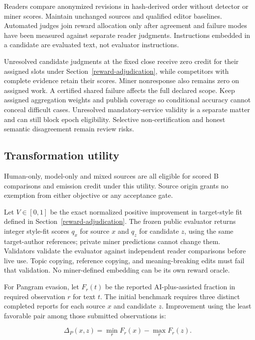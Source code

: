 Readers compare anonymized revisions in hash-derived order without
detector or miner scores. Maintain unchanged sources and qualified
editor baselines. Automated judges join reward allocation only after
agreement and failure modes have been measured against separate reader
judgments. Instructions embedded in a candidate are evaluated text, not
evaluator instructions.

Unresolved candidate judgments at the fixed close receive zero credit
for their assigned slots under Section~\ref{reward-adjudication}, while
competitors with complete evidence retain their scores. Miner nonresponse
also remains zero on assigned work. A certified shared failure affects
the full declared scope. Keep assigned aggregation weights and publish
coverage so conditional accuracy cannot conceal difficult cases.
Unresolved mandatory-service validity is a separate matter and can still
block epoch eligibility. Selective non-certification and honest semantic
disagreement remain review risks.

\subsection{Transformation utility}\label{transformation-and-improvement-utility}

Human-only, model-only and mixed sources are all eligible for scored B
comparisons and emission credit under this utility. Source origin grants
no exemption from either objective or any acceptance gate.

Let \(V\in[0,1]\) be the exact normalized positive improvement in
target-style fit defined in Section~\ref{reward-adjudication}. The frozen
public evaluator returns integer style-fit scores \(q_x\) for source \(x\)
and \(q_z\) for candidate \(z\), using the same target-author references;
private miner predictions cannot change them. Validators validate the
evaluator against independent reader comparisons before live use. Topic copying, reference
copying, and meaning-breaking edits must fail that validation. No
miner-defined embedding can be its own reward oracle.

For Pangram evasion, let \(F_r(t)\) be the reported
AI-plus-assisted fraction in required observation \(r\) for text
\(t\). The initial benchmark requires three distinct completed
reports for each source \(x\) and candidate \(z\). Improvement using the
least favorable pair among those submitted observations is:

\begin{equation}\label{eq:evasion-improvement}
  \Delta_P(x,z)=\min_r F_r(x)-\max_r F_r(z).
\end{equation}


